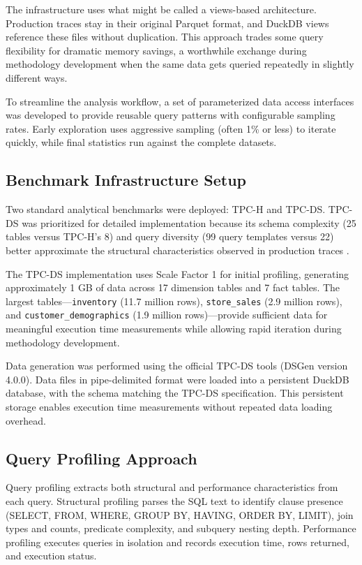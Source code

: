 \documentclass[12pt]{report}
\begin{document}
The infrastructure uses what might be called a views-based architecture. Production traces stay in their original Parquet format, and DuckDB views reference these files without duplication. This approach trades some query flexibility for dramatic memory savings, a worthwhile exchange during methodology development when the same data gets queried repeatedly in slightly different ways.

To streamline the analysis workflow, a set of parameterized data access interfaces was developed to provide reusable query patterns with configurable sampling rates. Early exploration uses aggressive sampling (often 1\% or less) to iterate quickly, while final statistics run against the complete datasets.

\subsection{Benchmark Infrastructure Setup}
\label{subsec:benchmark-infrastructure}

Two standard analytical benchmarks were deployed: TPC-H and TPC-DS. TPC-DS was prioritized for detailed implementation because its schema complexity (25 tables versus TPC-H's 8) and query diversity (99 query templates versus 22) better approximate the structural characteristics observed in production traces \cite{redset, snowset}.

The TPC-DS implementation uses Scale Factor 1 for initial profiling, generating approximately 1 GB of data across 17 dimension tables and 7 fact tables. The largest tables---\texttt{inventory} (11.7 million rows), \texttt{store\_sales} (2.9 million rows), and \texttt{customer\_demographics} (1.9 million rows)---provide sufficient data for meaningful execution time measurements while allowing rapid iteration during methodology development.

Data generation was performed using the official TPC-DS tools (DSGen version 4.0.0). Data files in pipe-delimited format were loaded into a persistent DuckDB database, with the schema matching the TPC-DS specification. This persistent storage enables execution time measurements without repeated data loading overhead.

\subsection{Query Profiling Approach}
\label{subsec:profiling-approach}

Query profiling extracts both structural and performance characteristics from each query. Structural profiling parses the SQL text to identify clause presence (SELECT, FROM, WHERE, GROUP BY, HAVING, ORDER BY, LIMIT), join types and counts, predicate complexity, and subquery nesting depth. Performance profiling executes queries in isolation and records execution time, rows returned, and execution status.
\end{document}
